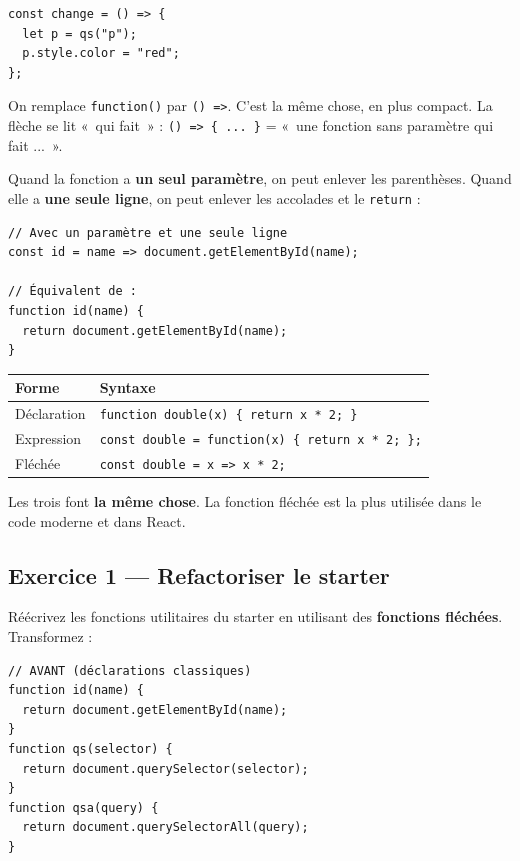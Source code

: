 \documentclass[11pt,a4paper]{article}
\begin{document}
\begin{lstlisting}
const change = () => {
  let p = qs("p");
  p.style.color = "red";
};
\end{lstlisting}

On remplace \texttt{function()} par \texttt{() =>}. C'est la même chose, en plus compact. La flèche se lit «~qui fait~» : \texttt{() => \{ ... \}} = «~une fonction sans paramètre qui fait ...~».

Quand la fonction a \textbf{un seul paramètre}, on peut enlever les parenthèses. Quand elle a \textbf{une seule ligne}, on peut enlever les accolades et le \texttt{return} :

\begin{lstlisting}
// Avec un paramètre et une seule ligne
const id = name => document.getElementById(name);

// Équivalent de :
function id(name) {
  return document.getElementById(name);
}
\end{lstlisting}

\begin{retenirbox}
\begin{center}
\begin{tabular}{lp{7.5cm}}
\toprule
\textbf{Forme} & \textbf{Syntaxe} \\
\midrule
Déclaration & \texttt{function double(x) \{ return x * 2; \}} \\
Expression & \texttt{const double = function(x) \{ return x * 2; \};} \\
Fléchée & \texttt{const double = x => x * 2;} \\
\bottomrule
\end{tabular}
\end{center}
Les trois font \textbf{la même chose}. La fonction fléchée est la plus utilisée dans le code moderne et dans React.
\end{retenirbox}

\subsection{Exercice 1 --- Refactoriser le starter}

\begin{objectifbox}
Réécrivez les fonctions utilitaires du starter en utilisant des \textbf{fonctions fléchées}. Transformez :
\end{objectifbox}

\begin{lstlisting}
// AVANT (déclarations classiques)
function id(name) {
  return document.getElementById(name);
}
function qs(selector) {
  return document.querySelector(selector);
}
function qsa(query) {
  return document.querySelectorAll(query);
}
\end{lstlisting}
\end{document}
